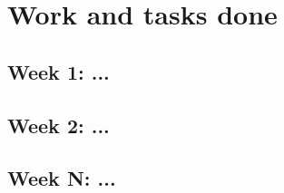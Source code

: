\section{Work and tasks done}
\subsection{Week 1: ...}
\subsection{Week 2: ...}
\subsection{Week N: ...}
